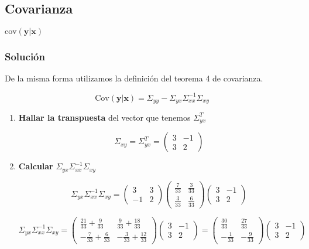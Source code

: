
\subsection{Covarianza}

$\text{cov}(\mathbf{y}|\mathbf{x})$

\subsubsection{Solución}

De la misma forma utilizamos la definición del teorema 4 de covarianza.

$$\text{Cov}(\mathbf{y}|\mathbf{x}) =
\Sigma_{yy} - \Sigma_{yx} \Sigma_{xx}^{-1} \Sigma_{xy}$$

\begin{enumerate}
    \item \textbf{Hallar la transpuesta} del vector que tenemos $\Sigma_{yx}^{T}$

    $$
    \Sigma_{xy} = \Sigma_{yx}^{T} =
    \begin{pmatrix}
    3 & -1 \\
    3 & 2
    \end{pmatrix}
    $$

    \item \textbf{Calcular }$\Sigma_{yx} \Sigma_{xx}^{-1} \Sigma_{xy}$

    $$
    \Sigma_{yx} \Sigma_{xx}^{-1} \Sigma_{xy} =
    \begin{pmatrix}
    3 & 3 \\
    -1 & 2
    \end{pmatrix}
    \begin{pmatrix}
    \frac{7}{33} & \frac{3}{33} \\
    \frac{3}{33} & \frac{6}{33}
    \end{pmatrix}
    \begin{pmatrix}
    3 & -1 \\
    3 & 2
    \end{pmatrix}
    $$

    $$
    \Sigma_{yx} \Sigma_{xx}^{-1} \Sigma_{xy} =
    \begin{pmatrix}
    \frac{21}{33}+\frac{9}{33} & \frac{9}{33}+\frac{18}{33} \\
    -\frac{7}{33}+\frac{6}{33} & -\frac{3}{33}+\frac{12}{33}
    \end{pmatrix}
    \begin{pmatrix}
    3 & -1 \\
    3 & 2
    \end{pmatrix} =
    \begin{pmatrix}
    \frac{30}{33} & \frac{27}{33} \\
    -\frac{1}{33} & -\frac{9}{33}
    \end{pmatrix}
    \begin{pmatrix}
    3 & -1 \\
    3 & 2
    \end{pmatrix}
    $$


\end{enumerate}

